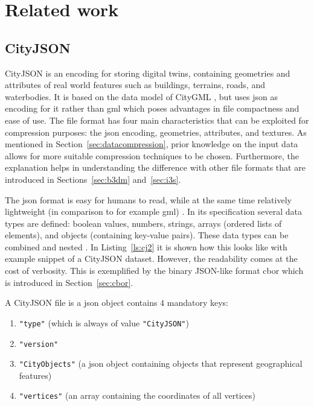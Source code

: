\chapter{Related work}
\label{chap:rw}

\section{CityJSON}
\label{sec:cityjsonexplained}

CityJSON \citep{cityjsonspecs} is an encoding for storing digital twins, containing geometries and attributes of real world features such as buildings, terrains, roads, and waterbodies.
It is based on the data model of CityGML \citep{citygml}, but uses \ac{json} as encoding for it rather than \ac{gml} which poses advantages in file compactness and ease of use.
The file format has four main characteristics that can be exploited for compression purposes: the \ac{json} encoding, geometries, attributes, and textures.
As mentioned in Section~\ref{sec:datacompression}, prior knowledge on the input data allows for more suitable compression techniques to be chosen.
Furthermore, the explanation helps in understanding the difference with other file formats that are introduced in Sections~\ref{sec:b3dm} and~\ref{sec:i3s}.

The \ac{json} format is easy for humans to read, while at the same time relatively lightweight (in comparison to for example \ac{gml}) \citep{json}.
In its specification several data types are defined: boolean values, numbers, strings, arrays (ordered lists of elements), and objects (containing key-value pairs).
These data types can be combined and nested \citep{ledoux2019cityjson}.
In Listing~\ref{ls:cj2} it is shown how this looks like with example snippet of a CityJSON dataset.
However, the readability comes at the cost of verbosity.
This is exemplified by the binary JSON-like format \ac{cbor} which is introduced in Section~\ref{sec:cbor}.

A CityJSON file is a \ac{json} object contains 4 mandatory keys:
\begin{enumerate}
\item \texttt{"type"} (which is always of value \texttt{"CityJSON"})
\item \texttt{"version"}
\item \texttt{"CityObjects"} (a \ac{json} object containing objects that represent geographical features)
\item \texttt{"vertices"} (an array containing the coordinates of all vertices)
\end{enumerate}

